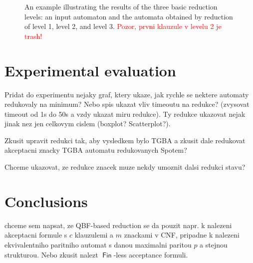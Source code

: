 \documentclass[a4paper,UKenglish,cleveref, autoref, thm-restate]{lipics-v2021}
\newcommand{\todo}[1]{\textcolor{red}{#1}}
\DeclareMathOperator{\Inf}{\mathsf{Inf}}
\DeclareMathOperator{\Fin}{\mathsf{Fin}}
\begin{document}
\begin{figure}[t]
  \smallskip
  
  \caption{An example illustrating the results of the three basic
    reduction levels: an input automaton and the automata
    obtained by reduction of level 1, level 2, and level 3.
    \todo{Pozor, prvni klauzule v levelu 2 je trash!}}
  \label{fig:example}
\end{figure}


\section{Experimental evaluation}\label{sec:experiments}

Pridat do experimentu nejaky graf, ktery ukaze, jak rychle se nektere
automaty redukovaly na minimum? Nebo spis ukazat vliv timeoutu na
redukce?  (zvysovat timeout od 1s do 50s a vzdy ukazat miru
redukce). Ty redukce ukazovat nejak jinak nez jen celkovym cislem
(boxplot? Scatterplot?).

Zkusit upravit redukci tak, aby vysledkem bylo TGBA a zkusit dale
redukovat akceptacni znacky TGBA automatu redukovanych Spotem?

Chceme ukazovat, ze redukce znacek muze nekdy umoznit dalsi redukci stavu?


\section{Conclusions}\label{sec:conclusion}

chceme sem napsat, ze QBF-based reduction se da pouzit napr. k
nalezeni akceptacni formule s $c$ klauzulemi a $m$ znackami v CNF,
pripadne k nalezeni ekvivalentniho paritniho automat s danou maximalni
paritou $p$ a stejnou strukturou. Nebo zkusit nalezt $\Fin$-less
acceptance formuli.
\end{document}
